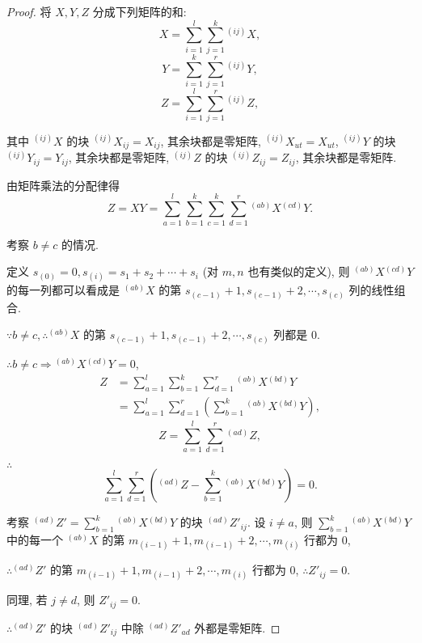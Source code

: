 \documentclass{ctexart}
\begin{document}
\begin{proof}
    将 $X,Y,Z$ 分成下列矩阵的和:
    \[X=\sum\limits_{i=1}^{l}\sum\limits_{j=1}^{k}{}^{(ij)}X,\]
    \[Y=\sum\limits_{i=1}^{k}\sum\limits_{j=1}^{r}{}^{(ij)}Y,\]
    \[Z=\sum\limits_{i=1}^{l}\sum\limits_{j=1}^{r}{}^{(ij)}Z,\]

    其中 ${}^{(ij)}X$ 的块 ${}^{(ij)}X_{ij}=X_{ij}$, 其余块都是零矩阵, ${}^{(ij)}X_{ut}=X_{ut}$, ${}^{(ij)}Y$ 的块 ${}^{(ij)}Y_{ij}=Y_{ij}$, 其余块都是零矩阵, ${}^{(ij)}Z$ 的块 ${}^{(ij)}Z_{ij}=Z_{ij}$, 其余块都是零矩阵.

    由矩阵乘法的分配律得
    \[Z=XY=\sum\limits_{a=1}^{l}\sum\limits_{b=1}^{k}\sum\limits_{c=1}^{k}\sum\limits_{d=1}^{r}{}^{(ab)}X{}^{(cd)}Y.\]

    考察 $b\neq c$ 的情况.

    定义 $s_{(0)}=0,s_{(i)}=s_1+s_2+\cdots+s_i$ (对 $m,n$ 也有类似的定义), 则 ${}^{(ab)}X{}^{(cd)}Y$ 的每一列都可以看成是 ${}^{(ab)}X$ 的第 $s_{(c-1)}+1,s_{(c-1)}+2,\cdots,s_{(c)}$ 列的线性组合.

    $\because b\neq c,\therefore{}^{(ab)}X$ 的第 $s_{(c-1)}+1,s_{(c-1)}+2,\cdots,s_{(c)}$ 列都是 $0$.

    $\therefore b\neq c\Rightarrow{}^{(ab)}X{}^{(cd)}Y=0$,
    \begin{align*}
        Z & =\sum\limits_{a=1}^{l}\sum\limits_{b=1}^{k}\sum\limits_{d=1}^{r}{}^{(ab)}X{}^{(bd)}Y \\
        & =\sum\limits_{a=1}^{l}\sum\limits_{d=1}^{r}\left(\sum\limits_{b=1}^{k}{}^{(ab)}X{}^{(bd)}Y\right),
    \end{align*}
    \[Z=\sum\limits_{a=1}^{l}\sum\limits_{d=1}^{r}{}^{(ad)}Z,\]

    $\therefore$
    \begin{equation}\label{eq4.7}
        \sum\limits_{a=1}^{l}\sum\limits_{d=1}^{r}\left({}^{(ad)}Z-\sum\limits_{b=1}^{k}{}^{(ab)}X{}^{(bd)}Y\right)=0.
    \end{equation}

    考察 $^{(ad)}Z'=\sum\limits_{b=1}^{k}{}^{(ab)}X{}^{(bd)}Y$ 的块 $^{(ad)}Z'_{ij}$. 设 $i\neq a$, 则 $\sum\limits_{b=1}^{k}{}^{(ab)}X{}^{(bd)}Y$ 中的每一个 $^{(ab)}X$ 的第 $m_{(i-1)}+1,m_{(i-1)}+2,\cdots,m_{(i)}$ 行都为 $0$,

    $\therefore{}^{(ad)}Z'$ 的第 $m_{(i-1)}+1,m_{(i-1)}+2,\cdots,m_{(i)}$ 行都为 $0$, $\therefore Z'_{ij}=0$.

    同理, 若 $j\neq d$, 则 $Z'_{ij}=0$.

    $\therefore{}^{(ad)}Z'$ 的块 $^{(ad)}Z'_{ij}$ 中除 $^{(ad)}Z'_{ad}$ 外都是零矩阵.


\end{proof}
\end{document}
